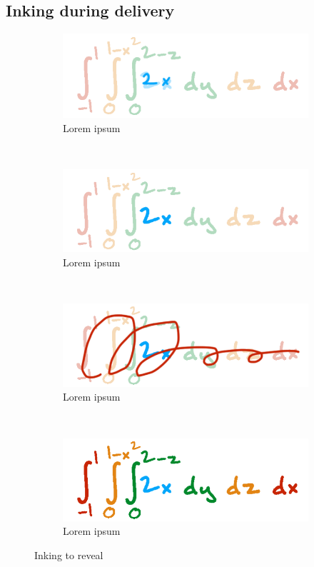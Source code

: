 \subsection{Inking during delivery}
%
\begin{figure}[t!]
    \centering
    \begin{subfigure}[t]{0.5\columnwidth}
        \centering
        \includegraphics[width=1\columnwidth]{figures/slowink_presenter}
        \caption{Lorem ipsum}
    \end{subfigure}%
    ~ 
    \begin{subfigure}[t]{0.5\columnwidth}
        \centering
        \includegraphics[width=1\columnwidth]{figures/slowink_audience}
        \caption{Lorem ipsum}
    \end{subfigure}
            ~
      \begin{subfigure}[t]{0.5\columnwidth}
        \centering
        \includegraphics[width=1\columnwidth]{figures/fastink_presenter}
        \caption{Lorem ipsum}
    \end{subfigure}%
    ~ 
    \begin{subfigure}[t]{0.5\columnwidth}
        \centering
        \includegraphics[width=1\columnwidth]{figures/fastink_audience}
        \caption{Lorem ipsum}
    \end{subfigure}
    \caption{Inking to reveal}
\end{figure}

